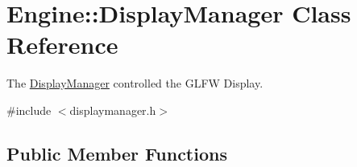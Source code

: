 \hypertarget{classEngine_1_1DisplayManager}{}\section{Engine\+:\+:Display\+Manager Class Reference}
\label{classEngine_1_1DisplayManager}


The \hyperlink{classEngine_1_1DisplayManager}{Display\+Manager} controlled the G\+L\+F\+W Display.  




{\ttfamily \#include $<$displaymanager.\+h$>$}

\subsection*{Public Member Functions}
